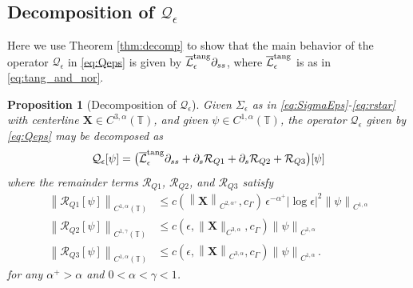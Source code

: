 \documentclass[11pt,reqno]{amsart}
\newcommand{\T}{\mathbb{T}}
\newcommand{\X}{\bm{X}}
\newcommand{\p}{\partial}
\newcommand{\abs}[1]{\left\lvert #1 \right\rvert}
\newcommand{\norm}[1]{\left\lVert #1 \right\rVert}
\newcommand{\mc}[1]{\mathcal{#1}}
\newtheorem{proposition}[theorem]{Proposition}
\theoremstyle{definition}
\begin{document}
\subsection{Decomposition of $\mc{Q}_\epsilon$}\label{subsec:decomp_Q}
Here we use Theorem \ref{thm:decomp} to show that the main behavior of the operator $\mc{Q}_\epsilon$ in \eqref{eq:Qeps} is given by $\overline{\mc{L}}_\epsilon^{\rm tang}\p_{ss}$, where $\overline{\mc{L}}_\epsilon^{\rm tang}$ is as in \eqref{eq:tang_and_nor}.
%
\begin{proposition}[Decomposition of $\mc{Q}_\epsilon$]\label{prop:Qdecomp}
Given $\Sigma_\epsilon$ as in \eqref{eq:SigmaEps}-\eqref{eq:rstar} with centerline $\X\in C^{3,\alpha}(\T)$, and given $\psi\in C^{1,\alpha}(\T)$, the operator $\mc{Q}_\epsilon$ given by \eqref{eq:Qeps} may be decomposed as 
\begin{equation}\label{eq:Qdecomp}
  \mc{Q}_\epsilon[\psi] = \big(\overline{\mc{L}}_\epsilon^{\rm tang}\p_{ss} +\p_s\mc{R}_{Q1} +\p_s\mc{R}_{Q2}
  +\mc{R}_{Q3}\big)[\psi]
\end{equation}
where the remainder terms $\mc{R}_{Q1}$, $\mc{R}_{Q2}$, and $\mc{R}_{Q3}$ satisfy
\begin{equation}
\begin{aligned}
  \norm{\mc{R}_{Q1}[\psi]}_{C^{1,\alpha}(\T)} &\le 
  c(\norm{\X}_{C^{2,\alpha^+}},c_\Gamma)\,\epsilon^{-\alpha^+}\abs{\log\epsilon}^2\norm{\psi}_{C^{1,\alpha}} \\
%
%
  \norm{\mc{R}_{Q2}[\psi]}_{C^{1,\gamma}(\T)} &\le 
  c(\epsilon,\|\X\|_{C^{3,\alpha}},c_\Gamma)\norm{\psi}_{C^{1,\alpha}}\\
%
%
\norm{\mc{R}_{Q3}[\psi]}_{C^{1,\alpha}(\T)} &\le 
 c(\epsilon,\norm{\X}_{C^{3,\alpha}},c_\Gamma)\norm{\psi}_{C^{1,\alpha}}\,.
\end{aligned}
\end{equation}
for any $\alpha^+>\alpha$ and $0<\alpha<\gamma<1$.


\end{proposition}
\end{document}
